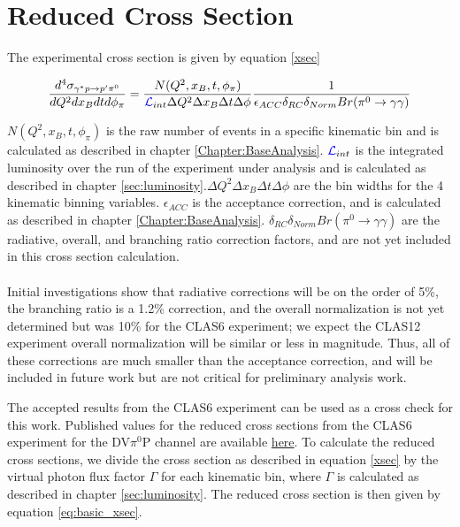 \section{Reduced Cross Section}

The experimental cross section is given by equation \ref{xsec}

 \begin{equation}\label{xsec}
     \frac{d^4\sigma_{\gamma^*p \rightarrow p'\pi^0}}{dQ^2dx_Bdtd\phi_{\pi}} = \frac{N(Q^2,x_B,t,\phi_{\pi})}{\textcolor{blue}{ \mathcal{L}}_{int}\Delta Q^2\Delta x_B\Delta t\Delta \phi} \frac{1}{\epsilon_{ACC} \delta_{RC} \delta_{Norm} Br(\pi^0 \rightarrow \gamma \gamma)}
\end{equation}

$N(Q^2,x_B,t,\phi_{\pi})$ is the raw number of events in a specific kinematic bin and is calculated as described in chapter \ref{Chapter:BaseAnalysis}. $\textcolor{blue}{ \mathcal{L}}_{int}$ is the integrated luminosity over the run of the experiment under analysis and is calculated as described in chapter \ref{sec:luminosity}.$\Delta Q^2\Delta x_B\Delta t\Delta \phi$ are the bin widths for the 4 kinematic binning variables. $\epsilon_{ACC}$ is the acceptance correction, and is calculated as described in chapter \ref{Chapter:BaseAnalysis}. $\delta_{RC} \delta_{Norm} Br(\pi^0 \rightarrow \gamma \gamma)$ are the radiative, overall, and branching ratio correction factors, and are not yet included in this cross section calculation. 
\\~\\
Initial investigations show that radiative corrections will be on the order of 5\%, the branching ratio is a 1.2\% correction, and the overall normalization is not yet determined but was 10\% for the CLAS6 experiment; we expect the CLAS12 experiment overall normalization will be similar or less in magnitude. Thus, all of these corrections are much smaller than the acceptance correction, and will be included in future work but are not critical for preliminary analysis work.

The accepted results from the CLAS6 experiment \cite{Bedlinskiy2014ExclusiveCLAS} can be used as a cross check for this work. Published values for the reduced cross sections from the CLAS6 experiment for the DV$\pi^0$P channel are available \href{https://journals.aps.org/prc/supplemental/10.1103/PhysRevC.90.025205}{here}. To calculate the reduced cross sections, we divide the cross section as described in equation \ref{xsec} by the virtual photon flux factor $\Gamma$ for each kinematic bin, where $\Gamma$ is calculated as described in chapter \ref{sec:luminosity}. The reduced cross section is then given by equation \ref{eq:basic_xsec}.

